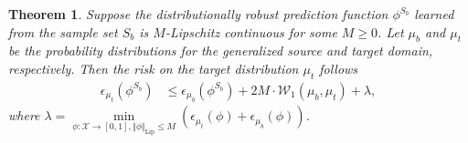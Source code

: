\documentclass[journal]{IEEEtran}
\newtheorem{theorem}{Theorem}%
\begin{document}
\begin{theorem}
\label{theorem:bound}
Suppose the distributionally robust prediction function $\phi^{S_b}$ learned from the sample set $S_b$ is $M$-Lipschitz continuous for some $M\geq0$.
Let $\mu_b$ and $\mu_t$ be the probability distributions for the generalized source and target domain, respectively.
Then the risk on the target distribution $\mu_t$ follows
\begin{equation}\label{eq:generalization}
\begin{aligned}
\epsilon_{\mu_{t}}(\phi^{S_b}) 
&\leq \epsilon_{\mu_{b}}(\phi^{S_b}) + 2M \cdot \mathcal{W}_{1}\left(\mu_{b}, \mu_{t}\right)+\lambda,
\end{aligned}
\end{equation}
where $\lambda=\underset{\phi:\mathcal{X}\rightarrow [0,1], \Vert\phi\Vert_{\textrm{Lip}}\leq M}{\min}\left(\epsilon_{\mu_t}(\phi) + \epsilon_{\mu_b}(\phi)\right)$.
\end{theorem}
\noindent
\end{document}
